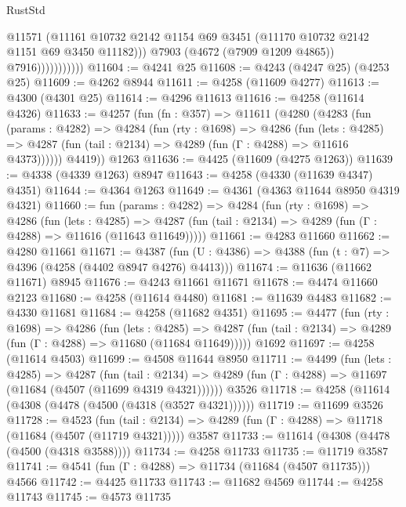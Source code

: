 \begin{lexlean}{RustStd}
\begin{coremodule}
{\begin{coremodule}
{{{{{{{{{{{{{{{{                            @11571
                            (@11161
                              @10732
                              @2142
                              @1154
                              @69
                              @3451
                              (@11170 @10732 @2142 @1151 @69 @3450 @11182)))
                          @7903
                          (@4672 (@7909 @1209 @4865))
                          @7916)))))))))))
@11604 := @4241 @25
@11608 := @4243 (@4247 @25) (@4253 @25)
@11609 := @4262 @8944
@11611 := @4258 (@11609 @4277)
@11613 := @4300 (@4301 @25)
@11614 := @4296 @11613
@11616 := @4258 (@11614 @4326)
@11633 := @4257
    (fun (fn : @357) =>
    @11611
      (@4280
        (@4283
          (fun (params : @4282) =>
          @4284
            (fun (rty : @1698) =>
            @4286
              (fun (lets : @4285) =>
              @4287 (fun (tail : @2134) => @4289 (fun (Γ : @4288) => @11616 @4373))))))
        @4419))
    @1263
@11636 := @4425 (@11609 (@4275 @1263))
@11639 := @4338 (@4339 @1263) @8947
@11643 := @4258 (@4330 (@11639 @4347) @4351)
@11644 := @4364 @1263
@11649 := @4361 (@4363 @11644 @8950 @4319 @4321)
@11660 := fun (params : @4282) =>
  @4284
    (fun (rty : @1698) =>
    @4286
      (fun (lets : @4285) =>
      @4287 (fun (tail : @2134) => @4289 (fun (Γ : @4288) => @11616 (@11643 @11649)))))
@11661 := @4283 @11660
@11662 := @4280 @11661
@11671 := @4387 (fun (U : @4386) => @4388 (fun (t : @7) => @4396 (@4258 (@4402 @8947 @4276) @4413)))
@11674 := @11636 (@11662 @11671) @8945
@11676 := @4243 @11661 @11671
@11678 := @4474 @11660 @2123
@11680 := @4258 (@11614 @4480)
@11681 := @11639 @4483
@11682 := @4330 @11681
@11684 := @4258 (@11682 @4351)
@11695 := @4477
    (fun (rty : @1698) =>
    @4286
      (fun (lets : @4285) =>
      @4287 (fun (tail : @2134) => @4289 (fun (Γ : @4288) => @11680 (@11684 @11649)))))
    @1692
@11697 := @4258 (@11614 @4503)
@11699 := @4508 @11644 @8950
@11711 := @4499
    (fun (lets : @4285) =>
    @4287
      (fun (tail : @2134) =>
      @4289 (fun (Γ : @4288) => @11697 (@11684 (@4507 (@11699 @4319 @4321))))))
    @3526
@11718 := @4258 (@11614 (@4308 (@4478 (@4500 (@4318 (@3527 @4321))))))
@11719 := @11699 @3526
@11728 := @4523
    (fun (tail : @2134) => @4289 (fun (Γ : @4288) => @11718 (@11684 (@4507 (@11719 @4321)))))
    @3587
@11733 := @11614 (@4308 (@4478 (@4500 (@4318 @3588))))
@11734 := @4258 @11733
@11735 := @11719 @3587
@11741 := @4541 (fun (Γ : @4288) => @11734 (@11684 (@4507 @11735))) @4566
@11742 := @4425 @11733
@11743 := @11682 @4569
@11744 := @4258 @11743
@11745 := @4573 @11735
}}}}}}}}}}}}}}}}
\end{coremodule}}
\end{coremodule}
\end{lexlean}
